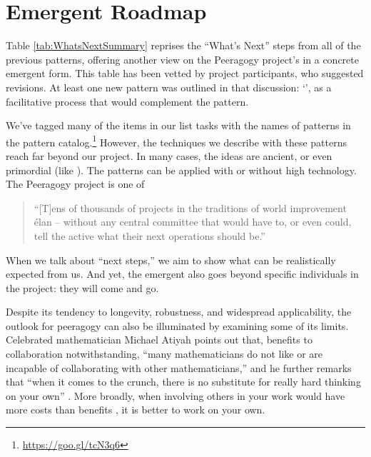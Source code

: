 \section{Emergent Roadmap} \label{sec:Distributed_Roadmap}

Table \ref{tab:WhatsNextSummary} reprises the ``What's Next'' steps
from all of the previous patterns, offering another view on the
Peeragogy project's  in a concrete emergent form.
%
This table has been vetted by project participants, who suggested
revisions.  At least one new pattern was outlined in that discussion:
`', as a facilitative process that would
complement the  pattern.

We've tagged many of the items in our list tasks with the names of
patterns in the pattern catalog.\footnote{\url{https://goo.gl/tcN3q6}}
However, the techniques we describe with these patterns reach far
beyond our project.  In many cases, the ideas are ancient, or even
primordial (like ).  The patterns can be
applied with or without high technology.  The Peeragogy project is one
of
\begin{quote}
 ``[T]ens of thousands of projects in the traditions of world
improvement \'elan -- without any central committee that would have
to, or even could, tell the active what their next operations should
be.'' \cite[p. 402]{sloterdijk2013change}
\end{quote}
When we talk about ``next steps,'' we aim to show what can be
realistically expected from us.
And yet, the emergent  also goes beyond specific
individuals in the project: they will come and go.

Despite its tendency to longevity, robustness, and
widespread applicability, the outlook for peeragogy can also be
illuminated by examining some of its limits.  Celebrated mathematician
Michael Atiyah points out that, benefits to collaboration
notwithstanding, ``many mathematicians do not like or are incapable of
collaborating with other mathematicians,'' and he further remarks that
``when it comes to the crunch, there is no substitute for really hard
thinking on your own'' \cite{atiyah1974research}.
More broadly, when involving others in your work would have more costs
than benefits \cite{coase1937nature}, it is better to work on your
own.

